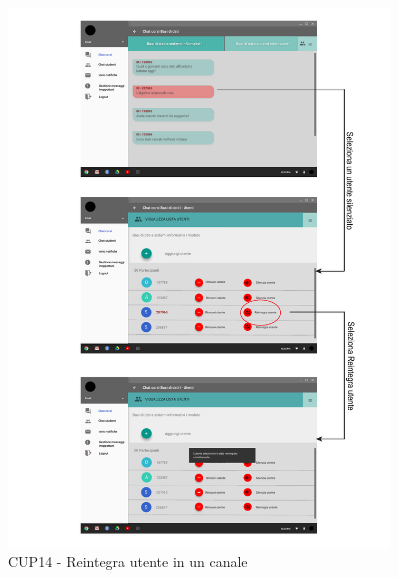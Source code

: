 \begin{figure}
	\centering
	\includegraphics[width=0.9\textwidth]{imgs/gruppo6/activities/act_cup14_reintegra_utente.pdf}
	\caption{CUP14 - Reintegra utente in un canale}
	\label{fig:act-cup14}
\end{figure}

